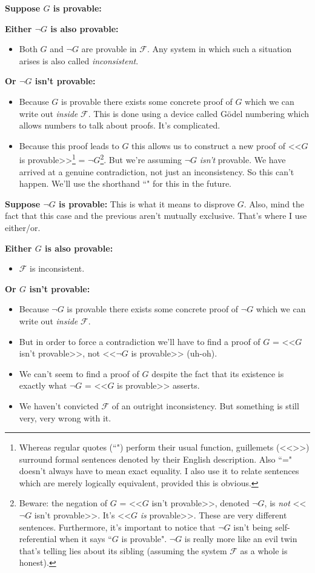 \documentclass{article}
\theoremstyle{theorem}
\newcommand{\nameditem}[1]{\item\textbf{#1}}
\newcommand{\impl}{\item[$\Rightarrow$]}
\begin{document}
\begin{description}
\nameditem{Suppose $G$ is provable:}
\begin{description}
\nameditem{Either $\neg G$ is also provable:}
\begin{itemize}
\impl Both $G$ and $\neg G$ are provable in $\mathcal{F}$. Any system in which such a situation arises is also called \textit{inconsistent}.
\end{itemize}
\nameditem{Or $\neg G$ isn't provable:}
\begin{itemize}
\impl Because $G$ is provable there exists some concrete proof of $G$ which we can write out \textit{inside} $\mathcal{F}$. This is done using a device called Gödel numbering which allows numbers to talk about proofs. It's complicated.
\impl Because this proof leads to $G$ this allows us to construct a new proof of <<$G$ is provable>>\footnote{Whereas regular quotes (``") perform their usual function, guillemets (<<>>) surround formal sentences denoted by their English description. Also ``=" doesn't always have to mean exact equality. I also use it to relate sentences which are merely logically equivalent, provided this is obvious.} = $\neg G$\footnote{Beware: the negation of $G$ = <<$G$ isn't provable>>, denoted $\neg G$, is \textit{not} <<$\neg G$ isn't provable>>. It's <<$G$ \textit{is} provable>>. These are very different sentences. Furthermore, it's important to notice that $\neg G$ isn't being self-referential when it says ``$G$ is provable". $\neg G$ is really more like an evil twin that's telling lies about its sibling (assuming the system $\mathcal{F}$  as a whole is honest).}. But we're assuming $\neg G$ \textit{isn't} provable. We have arrived at a genuine contradiction, not just an inconsistency. So this can't happen. We'll use the shorthand ``\lightning" for this in the future.
\end{itemize}
\end{description}
\nameditem{Suppose $\neg G$ is provable:}
This is what it means to disprove $G$. Also, mind the fact that this case and the previous aren't mutually exclusive. That's where I use either/or.
\begin{description}
\nameditem{Either $G$ is also provable:}
\begin{itemize}
\impl $\mathcal{F}$ is inconsistent.
\end{itemize}
\nameditem{Or $G$ isn't provable:}
\begin{itemize}
\impl Because $\neg G$ is provable there exists some concrete proof of $\neg G$ which we can write out \textit{inside} $\mathcal{F}$.
\impl But in order to force a contradiction we'll have to find a proof of $G$ = <<$G$ isn't provable>>, not <<$\neg G$ is provable>> (uh-oh).
\impl We can't seem to find a proof of $G$ despite the fact that its existence is exactly what $\neg G$ = <<$G$ is provable>> asserts.
\impl We haven't convicted $\mathcal{F}$ of an outright inconsistency. But something is still very, very wrong with it.
\end{itemize}
\end{description}
\end{description}
\end{document}
